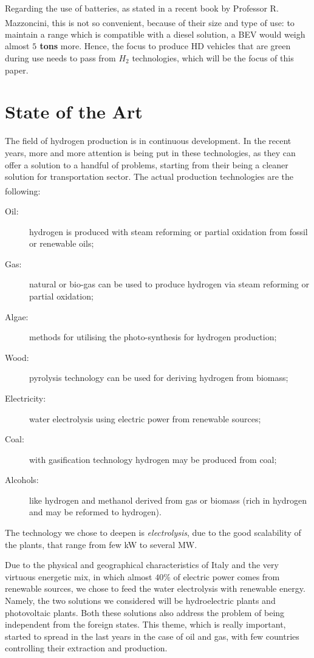 Regarding the use of batteries, as stated in a recent book by Professor R. Mazzoncini\textsuperscript{\cite{Mazzo2021}}, this is not so convenient, because of their size and type of use: to maintain a range which is compatible with a diesel solution, a BEV would weigh almost\textbf{ $5$ tons} more. Hence, the focus to produce HD vehicles that are green during use needs to pass from $H_2$ technologies, which will be the focus of this paper.

\section{State of the Art}
The field of hydrogen production is in continuous development. In the recent years, more and more attention is being put in these technologies, as they can offer a solution to a handful of problems, starting from their being a cleaner solution for transportation sector. The actual production technologies are the following\textsuperscript{\cite{guanda20211}}:

\begin{description}
    \item[Oil:] hydrogen is produced with steam reforming or partial oxidation from fossil or renewable oils;
    \item[Gas:] natural or bio-gas can be used to produce hydrogen via steam reforming or partial oxidation;
    \item[Algae:] methods for utilising the photo-synthesis for hydrogen production;
    \item[Wood:] pyrolysis technology can be used for deriving hydrogen from biomass;
    \item[Electricity:] water electrolysis using electric power from renewable sources;
    \item[Coal:] with gasification technology hydrogen may be produced from coal;
    \item[Alcohols:] like hydrogen and methanol derived from gas or biomass (rich in hydrogen and may be reformed to hydrogen).
\end{description}

The technology we chose to deepen is \textit{electrolysis}, due to the good scalability of the plants, that range from few kW to several MW.

Due to the physical and geographical characteristics of Italy and the very virtuous energetic mix, in which almost $40\%$ of electric power comes from renewable sources, we chose to feed the water electrolysis with renewable energy. Namely, the two solutions we considered will be hydroelectric plants and photovoltaic plants. Both these solutions also address the problem of being independent from the foreign states. This theme, which is really important, started to spread in the last years in the case of oil and gas, with few countries controlling their extraction and production.


